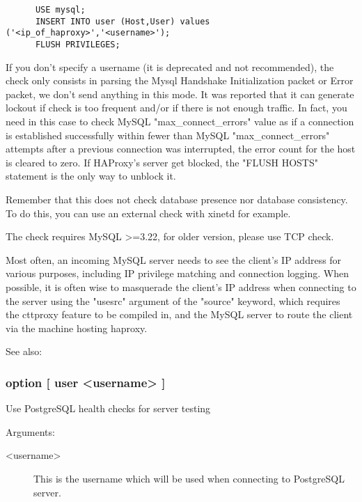 {\begin{verbatim}
      USE mysql;
      INSERT INTO user (Host,User) values ('<ip_of_haproxy>','<username>');
      FLUSH PRIVILEGES;
\end{verbatim}

  If you don't specify a username (it is deprecated and not recommended), the
  check only consists in parsing the Mysql Handshake Initialization packet or
  Error packet, we don't send anything in this mode. It was reported that it
  can generate lockout if check is too frequent and/or if there is not enough
  traffic. In fact, you need in this case to check MySQL "max\_connect\_errors"
  value as if a connection is established successfully within fewer than MySQL
  "max\_connect\_errors" attempts after a previous connection was interrupted,
  the error count for the host is cleared to zero. If HAProxy's server get
  blocked, the "FLUSH HOSTS" statement is the only way to unblock it.

  Remember that this does not check database presence nor database consistency.
  To do this, you can use an external check with xinetd for example.

  The check requires MySQL >=3.22, for older version, please use TCP check.

  Most often, an incoming MySQL server needs to see the client's IP address for
  various purposes, including IP privilege matching and connection logging.
  When possible, it is often wise to masquerade the client's IP address when
  connecting to the server using the "usesrc" argument of the "source" keyword,
  which requires the cttproxy feature to be compiled in, and the MySQL server
  to route the client via the machine hosting haproxy.

  See also: 

\subsubsection[pgsql-check]{option  [ user <username> ]}


  Use PostgreSQL health checks for server testing


  Arguments:
\begin{description}
\item[<username>] This is the username which will be used when connecting to
               PostgreSQL server.
\end{description}

}
